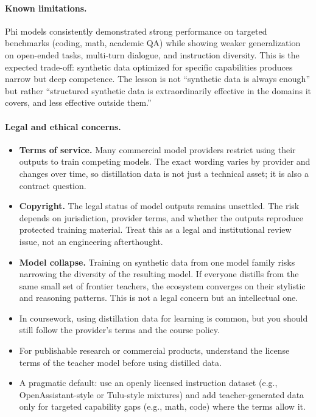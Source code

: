 \paragraph{Known limitations.} Phi models consistently demonstrated strong performance on targeted benchmarks (coding, math, academic QA) while showing weaker generalization on open-ended tasks, multi-turn dialogue, and instruction diversity. This is the expected trade-off: synthetic data optimized for specific capabilities produces narrow but deep competence. The lesson is not ``synthetic data is always enough'' but rather ``structured synthetic data is extraordinarily effective in the domains it covers, and less effective outside them.''

\paragraph{Legal and ethical concerns.}

\begin{itemize}[nosep]
  \item \textbf{Terms of service.} Many commercial model providers restrict using their outputs to train competing models. The exact wording varies by provider and changes over time, so distillation data is not just a technical asset; it is also a contract question.
  \item \textbf{Copyright.} The legal status of model outputs remains unsettled. The risk depends on jurisdiction, provider terms, and whether the outputs reproduce protected training material. Treat this as a legal and institutional review issue, not an engineering afterthought.
  \item \textbf{Model collapse.} Training on synthetic data from one model family risks narrowing the diversity of the resulting model. If everyone distills from the same small set of frontier teachers, the ecosystem converges on their stylistic and reasoning patterns. This is not a legal concern but an intellectual one.
\end{itemize}

\begin{tcolorbox}[colback=orange!5, colframe=orange!60, title=\textbf{For Project~3: Distillation Data}]
\begin{itemize}[nosep]
  \item In coursework, using distillation data for learning is common, but you should still follow the provider's terms and the course policy.
  \item For publishable research or commercial products, understand the license terms of the teacher model before using distilled data.
  \item A pragmatic default: use an openly licensed instruction dataset (e.g., OpenAssistant-style or Tulu-style mixtures) and add teacher-generated data only for targeted capability gaps (e.g., math, code) where the terms allow it.
\end{itemize}
\end{tcolorbox}

